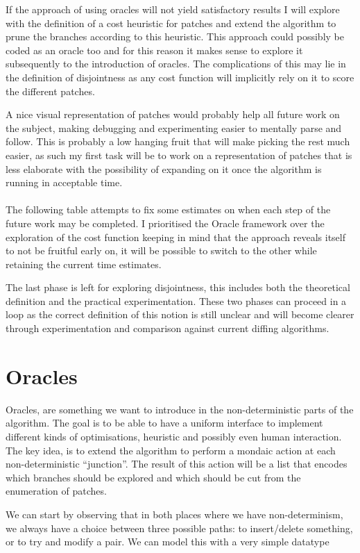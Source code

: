 \documentclass[11pt]{article}
\begin{document}
If the approach of using oracles will not yield satisfactory results I will explore with the definition of a cost heuristic
for patches and extend the algorithm to prune the branches according to this heuristic. This approach could 
possibly be coded as an oracle too and for this reason it makes sense to explore it subsequently to the introduction
of oracles. The complications of this may lie in the definition of disjointness 
as any cost function will implicitly rely on it to score the different patches. 

A nice visual representation of patches would probably help all future work on the subject, making debugging and 
experimenting easier to mentally parse and follow. This is probably a low 
hanging fruit that will make picking the rest much easier, as such my first task 
will be to work on a representation of patches that is less elaborate with 
the possibility of expanding on it once the algorithm is running in acceptable 
time.
\\\\
The following table attempts to fix some estimates on when each step of the 
future work may be completed. I prioritised the Oracle framework over the 
exploration of the cost function keeping in mind that the approach reveals 
itself to not be fruitful early on, it will be possible to switch to the other 
while retaining the current time estimates.

The last phase is left for exploring disjointness, this includes both the theoretical 
definition and the practical experimentation. These two 
phases can proceed in a loop as the correct definition of this notion is still 
unclear and will become clearer through experimentation and comparison against 
current diffing algorithms.

\section{Oracles}
Oracles, are something we want to introduce in the non-deterministic parts of 
the algorithm. The goal is to be able to have a uniform interface to implement 
different kinds of optimisations, heuristic and possibly even human interaction. 
The key idea, is to extend the algorithm to perform a mondaic action at each 
non-deterministic ``junction''. The result of this action will be a list that 
encodes which branches should be explored and which should be cut from the enumeration of patches.

We can start by observing that in both places where we have non-determinism, we always have a 
choice between three possible paths: to insert/delete something, or to try and 
modify a pair. We can model this with a very simple datatype
\end{document}
